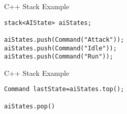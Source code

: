 \begin{frame}[fragile]{C++ Stack
Example}
\begin{lstlisting}
stack<AIState> aiStates;

aiStates.push(Command("Attack"));
aiStates.push(Command("Idle"));
aiStates.push(Command("Run"));
\end{lstlisting}
\end{frame}

\begin{frame}[fragile]{C++ Stack
	Example}
\begin{lstlisting}
Command lastState=aiStates.top();

aiStates.pop()
\end{lstlisting}
\end{frame}